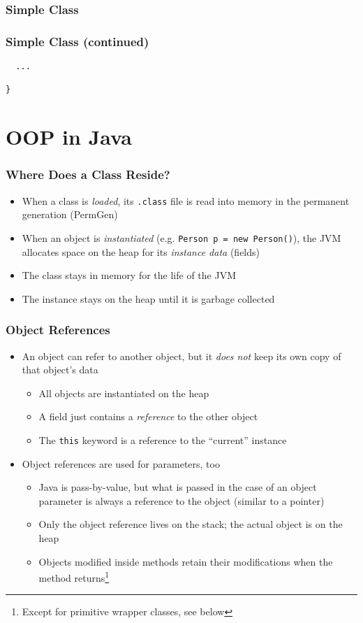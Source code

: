 \documentclass{beamer}
\begin{document}
\begin{frame}[fragile]
\frametitle{Simple Class}

\end{frame}

\begin{frame}[fragile]
\frametitle{Simple Class (continued)}

\lstset{language=Java}
\begin{lstlisting}
  ...
    
}
\end{lstlisting}
\end{frame}

\section{OOP in Java}
\begin{frame}
\frametitle{Where Does a Class Reside?}
\begin{itemize}
\item When a class is \emph{loaded}, its \texttt{.class} file is read into memory in the permanent generation (PermGen)
\item When an object is \emph{instantiated} (e.g. \texttt{Person p = new Person()}), the JVM allocates space on the heap for its \emph{instance data} (fields)
\item The class stays in memory for the life of the JVM
\item The instance stays on the heap until it is garbage collected
\end{itemize}
\end{frame}

\begin{frame}
\frametitle{Object References}
\begin{itemize}
\item An object can refer to another object, but it \emph{does not} keep its own copy of that object's data
\begin{itemize}
\item All objects are instantiated on the heap
\item A field just contains a \emph{reference} to the other object
\item The \texttt{this} keyword is a reference to the ``current'' instance
\end{itemize}
\item Object references are used for parameters, too
\begin{itemize}
\item Java is pass-by-value, but what is passed in the case of an object parameter is always a reference to the object (similar to a pointer)
\item Only the object reference lives on the stack; the actual object is on the heap
\item Objects modified inside methods retain their modifications when the method returns\footnote{Except for primitive wrapper classes, see below}
\end{itemize}
\end{itemize}
\end{frame}
\end{document}
